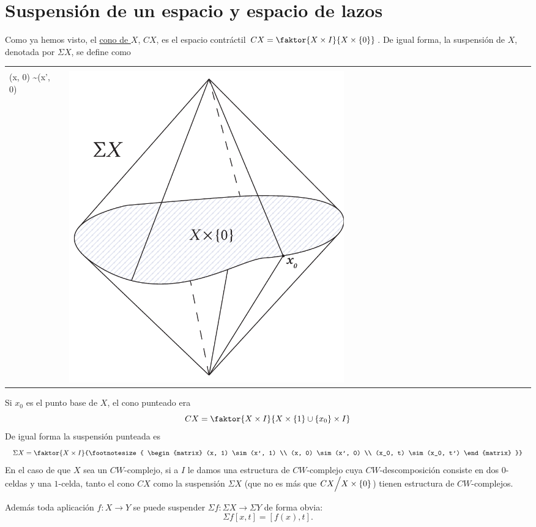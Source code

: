 \section{Suspensión de un espacio y espacio de lazos}
Como ya hemos visto, el \hyperlink{ecom:cono}{cono de $X$}, $CX$, es el espacio contráctil $CX = \faktor{X \times I }{X \times \{ 0 \}}$. De igual forma, la suspensión de $X$, denotada por $\Sigma X$, se define como \par 
\begin{tabular}{ll}
\begin{minipage}{0.5\textwidth}
\[ \Sigma X =  \faktor{X \times I}
{ \footnotesize{\begin{matrix}
(x, 1) \sim (x', 1) \\
(x, 0) \sim (x', 0)
\end{matrix}}} \] 
\end{minipage}
&
\begin{minipage}{0.5\textwidth}
\includegraphics[width=0.6\textwidth]{images/suspensionalt.pdf}
\end{minipage}
\end{tabular}
Si $x_0$ es el punto base de $X$, el cono punteado era
\[ CX = \faktor{X \times I}{X \times \{ 1 \}  \cup \{ x_0 \} \times I}\]
De igual forma la suspensión punteada es 
\[ \Sigma X = \faktor{ X \times I }
{\footnotesize{ \begin{matrix}
(x, 1) \sim (x', 1) \\ 
(x, 0) \sim (x', 0) \\ 
(x_0, t) \sim (x_0, t')
\end{matrix} }} \]
En el caso de que $X$ sea un $CW$-complejo, si a $I$ le damos una  estructura de $CW$-complejo cuya $CW$-descomposición consiste en dos $0$-celdas y una $1$-celda, tanto el cono $CX$ como la suspensión $\Sigma X$ (que no es más que $CX \Bign/ X \times \{ 0 \}$) tienen estructura de $CW$-complejos. \par
Además toda aplicación $f : X \longrightarrow Y$ se puede suspender $\Sigma f : \Sigma X \longrightarrow \Sigma Y$ de forma obvia:
\[\Sigma f [x, t] = [f(x), t]. \]

